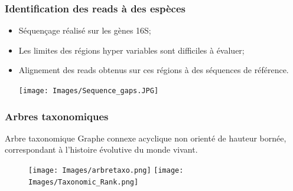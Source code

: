 \documentclass{beamer}
\begin{document}
\begin{frame}
\frametitle{Identification des reads à des espèces}

\begin{itemize}
\item Séquençage réalisé sur les gènes 16S;
\bigskip
\item Les limites des \alert{régions hyper variables} sont difficiles à évaluer;
\bigskip
\item \alert{Alignement} des reads obtenus sur ces régions à des séquences de référence.

\begin{center}
\texttt{[image: Images/Sequence\_gaps.JPG]}
\end{center}

\end{itemize}

\end{frame}

\begin{frame}
\frametitle{Arbres taxonomiques}

\begin{block}{Arbre taxonomique} Graphe connexe acyclique non orienté de hauteur bornée, correspondant à l'histoire évolutive du monde vivant.
\end{block}


\begin{figure}
\subfigure\texttt{[image: Images/arbretaxo.png]}
\subfigure\texttt{[image: Images/Taxonomic\_Rank.png]}
\end{figure}


\end{frame}
\end{document}
